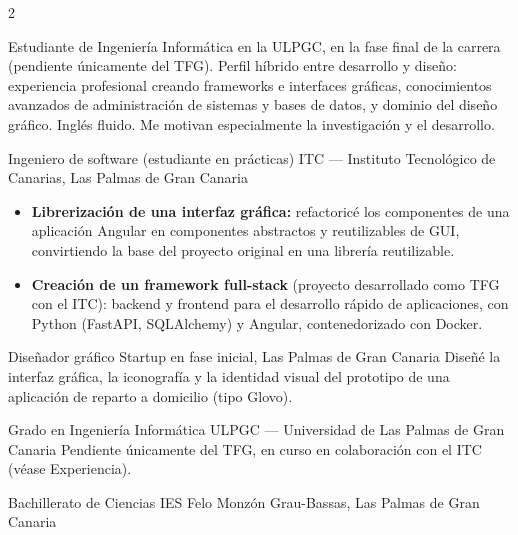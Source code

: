 \documentclass[10.5pt]{article}
\begin{document}
\setlength{\columnsep}{22pt}
\begin{paracol}{2}

Estudiante de Ingeniería Informática en la ULPGC, en la fase final de la
carrera (pendiente únicamente del TFG). Perfil híbrido entre desarrollo y
diseño: experiencia profesional creando frameworks e interfaces gráficas,
conocimientos avanzados de administración de sistemas y bases de datos, y
dominio del diseño gráfico. Inglés fluido. Me motivan especialmente la
investigación y el desarrollo.

        {Ingeniero de software (estudiante en prácticas)}
        {ITC — Instituto Tecnológico de Canarias, Las Palmas de Gran Canaria}
        {\begin{itemize}
          \item \textbf{Librerización de una interfaz gráfica:} refactoricé
                los componentes de una aplicación Angular en componentes
                abstractos y reutilizables de GUI, convirtiendo la base del
                proyecto original en una librería reutilizable.
          \item \textbf{Creación de un framework full-stack} (proyecto
                desarrollado como TFG con el ITC): backend y frontend para
                el desarrollo rápido de aplicaciones, con Python (FastAPI,
                SQLAlchemy) y Angular, contenedorizado con Docker.
        \end{itemize}}

        {Diseñador gráfico}
        {Startup en fase inicial, Las Palmas de Gran Canaria}
        {Diseñé la interfaz gráfica, la iconografía y la identidad visual
        del prototipo de una aplicación de reparto a domicilio (tipo
        Glovo).}

        {Grado en Ingeniería Informática}
        {ULPGC — Universidad de Las Palmas de Gran Canaria}
        {Pendiente únicamente del TFG, en curso en colaboración con el
        ITC (véase Experiencia).}

        {Bachillerato de Ciencias}
        {IES Felo Monzón Grau-Bassas, Las Palmas de Gran Canaria}
        {\relax}

\switchcolumn


\end{paracol}
\end{document}
